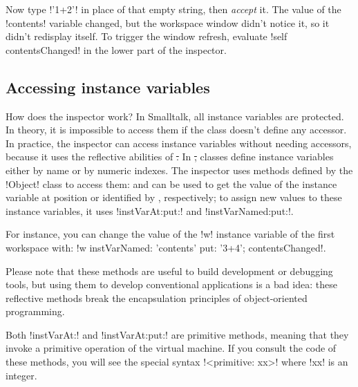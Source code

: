 \documentclass[a4paper,10pt,twoside]{book}
\begin{document}


Now type \ct!'1+2'! in place of that empty string, then \emph{accept} it.
The value of the \ct!contents! variable changed, but the workspace window didn't notice it, so it didn't redisplay itself.
To trigger the window refresh, evaluate \ct!self contentsChanged! in the lower part of the inspector. 

\subsection{Accessing instance variables}

How does the inspector work?
In Smalltalk, all instance variables are protected.
In theory, it is impossible to access them if the class doesn't define any accessor.
In practice, the inspector can access instance variables without needing accessors, because it uses the reflective abilities of \st.
In \st, classes define instance variables either by name or by numeric indexes.
The inspector uses methods defined by the \ct!Object! class to access them:  and  can be used to get the value of the instance variable at position  or identified by , respectively; to assign new values to these instance variables, it uses \ct!instVarAt:put:! and \ct!instVarNamed:put:!.

For instance, you can change the value of the \ct!w! instance variable of the first workspace with: \ct!w instVarNamed: 'contents' put: '3+4'; contentsChanged!.

Please note that these methods are useful to build development or debugging tools, but using them to develop conventional applications is a bad idea: these reflective methods break the encapsulation principles of object-oriented programming.

Both \ct!instVarAt:! and \ct!instVarAt:put:! are primitive methods, meaning that they invoke a primitive operation of the \squeak virtual machine.
If you consult the code of these methods, you will see the special syntax \ct!<primitive: xx>! where \ct!xx! is an integer.
\end{document}
